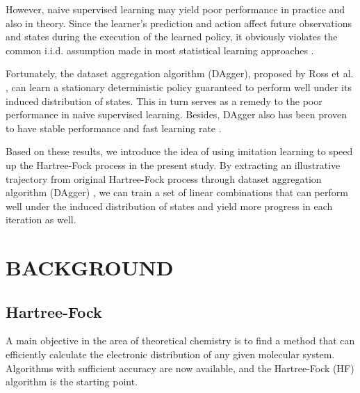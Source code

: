 \documentclass[twoside,11pt]{article}
\begin{document}


However, naive supervised learning may yield poor performance in practice and also in theory.  Since the learner's prediction and action affect future observations and states during the execution of the learned policy, it obviously violates the common i.i.d. assumption made in most statistical learning approaches \cite{Ross}.



Fortunately, the dataset aggregation algorithm (DAgger), proposed by Ross et al. \cite{DAgger}, can learn a stationary deterministic policy guaranteed to perform well under its induced distribution of states. This in turn serves as a remedy to the poor performance in naive supervised learning. Besides, DAgger also has been proven to have stable performance and fast learning rate \cite{DAggerCompare}.

Based on these results, we introduce the idea of using imitation learning to speed up the Hartree-Fock process in the present study. By extracting an illustrative trajectory from original Hartree-Fock process
through dataset aggregation algorithm (DAgger) \cite{DAgger}, we can train a set of linear combinations that can perform well under the induced distribution of states and yield more progress in each iteration as well. 


\section{BACKGROUND}

\subsection{Hartree-Fock}



A main objective in the area of theoretical chemistry is to find a method that can efficiently calculate the electronic distribution of any given molecular system. %
Algorithms with sufficient accuracy are now available, and the Hartree-Fock (HF) algorithm is the starting point.
\end{document}

